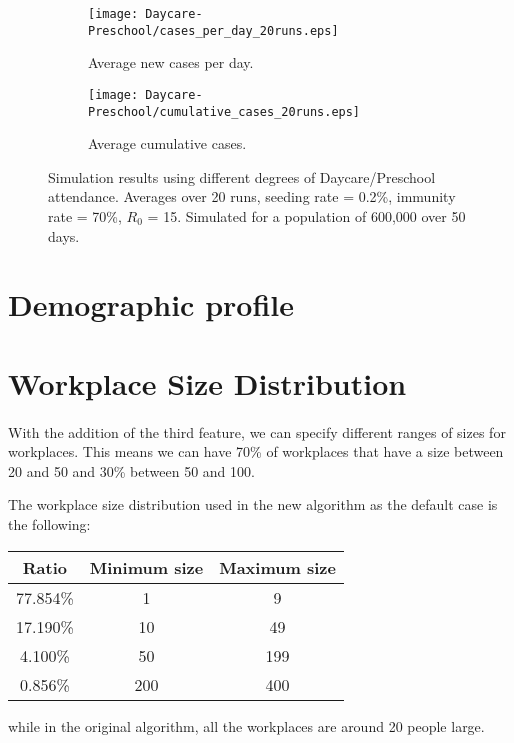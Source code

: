\documentclass[runningheads]{llncs}
\begin{document}
\begin{figure}
	\centering
	\begin{subfigure}[b]{0.6\linewidth}
		\texttt{[image: Daycare-Preschool/cases\_per\_day\_20runs.eps]}
		\caption{Average new cases per day.}
	\end{subfigure}
	\begin{subfigure}[b]{0.6\linewidth}
		\texttt{[image: Daycare-Preschool/cumulative\_cases\_20runs.eps]}
		\caption{Average cumulative cases.}
	\end{subfigure}
	\caption{Simulation results using different degrees of Daycare/Preschool attendance. Averages over 20 runs, seeding rate = 0.2\%, immunity rate = 70\%, $R_0$ = 15. Simulated for a population of 600,000 over 50 days.}
	\label{daycare-preschool}
\end{figure}


\section{Demographic profile}

\section{Workplace Size Distribution}
\paragraph{}
With the addition of the third feature, we can specify different ranges of sizes for workplaces. This means we can have 70\% of workplaces that have a size between 20 and 50 and 30\% between 50 and 100.

The workplace size distribution used in the new algorithm as the default case is the following:
\begin{table}[!h]
	\centering
	\begin{tabular}{|c|c|c|}
		\hline
		Ratio & Minimum size & Maximum size \\\hline
		77.854\% & 1 & 9 \\\hline
		17.190\% & 10 & 49 \\\hline
		4.100\% & 50 & 199 \\\hline
		0.856\% & 200 & 400 \\\hline
	\end{tabular}
\end{table}

while in the original algorithm, all the workplaces are around 20 people large.
\end{document}
